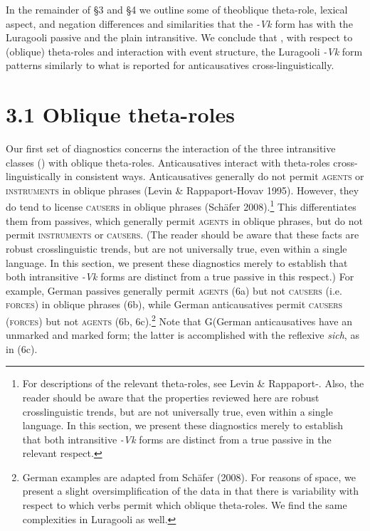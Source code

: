 \documentclass[output=paper]{langsci/langscibook}
\begin{document}
In the remainder of §3 and §4 
 we outline some of theoblique theta-role, lexical aspect, and negation differences and similarities that the \textit{{}-}\textit{Vk} form has with the Luragooli passive and the plain intransitive. We conclude that , with respect to (oblique) theta-roles and interaction with event structure, the Luragooli \textit{{}-}\textit{Vk} form patterns similarly to what is reported for anticausatives cross-linguistically.

\section{3.1 Oblique theta-roles}

Our first set of diagnostics concerns the interaction of the three intransitive classes () with oblique theta-roles. Anticausatives interact with theta-roles cross-linguistically in consistent ways. Anticausatives generally do not permit \textsc{a}\textsc{gents }or \textsc{i}\textsc{nstruments }in oblique phrases (Levin \& Rappaport-Hovav 1995). However, they do tend to license \textsc{c}\textsc{ausers} in oblique phrases (Schäfer 2008).\footnote{ For descriptions of the relevant theta-roles, see Levin \& Rappaport-\citet{Hovav1995}. Also, the reader should be aware that the properties reviewed here are robust crosslinguistic trends, but are not universally true, even within a single language. In this section, we present these diagnostics merely to establish that both intransitive \textit{{}-Vk} forms are distinct from a true passive in the relevant respect.} This differentiates them from passives, which generally permit \textsc{agents} in oblique phrases, but do not permit \textsc{instruments }or \textsc{causers}. (The reader should be aware that these facts are robust crosslinguistic trends, but are not universally true, even within a single language. In this section, we present these diagnostics merely to establish that both intransitive \textit{{}-Vk} forms are distinct from a true passive in this respect.) 
For example, German passives generally permit \textsc{agents (6}a) but not \textsc{causers }\textsc{(}i.e. \textsc{force}\textsc{s}) in oblique phrases\textsc{ }(6b), while German anticausatives permit \textsc{causers} (\textsc{forces}) but not \textsc{agents }(6b, 6c).\footnote{{ }German examples are adapted from Schäfer (2008). For reasons of space, we present a slight oversimplification of the data in that there is variability with respect to which verbs permit which oblique theta-roles. We find the same complexities in Luragooli as well.}\textsuperscript{ }\textsuperscript{ }Note that G(German anticausatives have an unmarked and marked form; the latter is accomplished with the reflexive \textit{sich}, as in (6c).
\end{document}
